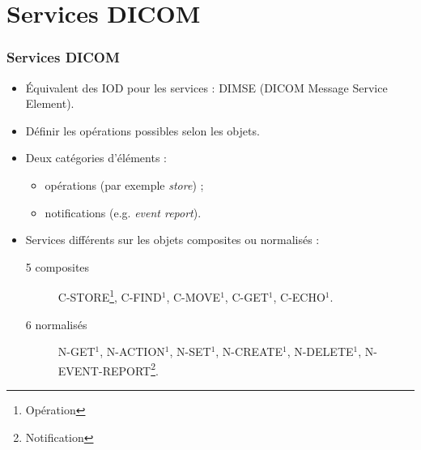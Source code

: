 \section{Services DICOM}

\frame
{
	\frametitle{Services DICOM}
	
	\begin{itemize}
		\item \'Equivalent des IOD pour les services : DIMSE (DICOM Message Service Element).
		\item D\'efinir les op\'erations possibles selon les objets.
		\item Deux cat\'egories d'\'el\'ements :
		\begin{itemize}
			\item op\'erations (par exemple \emph{store}) ;
			\item notifications (e.g. \emph{event report}).
		\end{itemize}
		\item Services diff\'erents sur les objets composites ou normalis\'es :
		\begin{description}
			\item[5 composites] C-STORE\footnote{Op\'eration}, C-FIND$^1$, C-MOVE$^1$, C-GET$^1$, C-ECHO$^1$.
			\item[6 normalis\'es] N-GET$^1$, N-ACTION$^1$, N-SET$^1$, N-CREATE$^1$, N-DELETE$^1$, N-EVENT-REPORT\footnote{Notification}.
		\end{description}
	\end{itemize}
}

